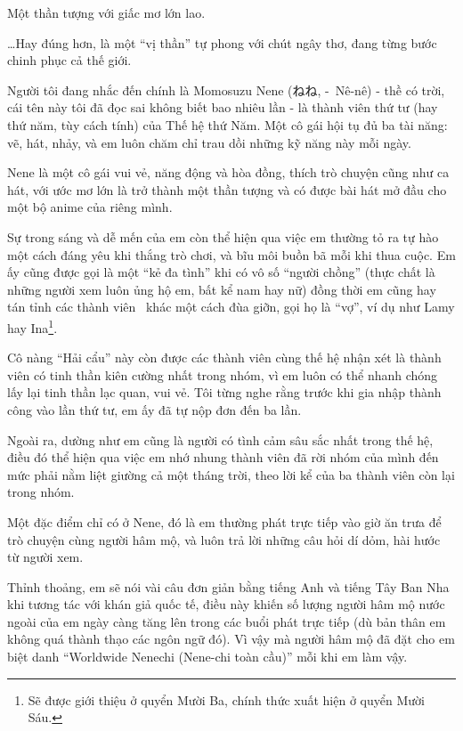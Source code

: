 \documentclass[../main.tex]{subfiles}
\begin{document}
Một thần tượng với giấc mơ lớn lao.

\dots Hay đúng hơn, là một ``vị thần'' tự phong với chút ngây thơ, đang từng bước chinh phục cả thế giới.

\chrint


Người tôi đang nhắc đến chính là Momosuzu Nene (ねね, -\ Nê-nê) - thề có trời, cái tên này tôi đã đọc sai không biết bao nhiêu lần - là thành viên thứ tư (hay thứ năm, tùy cách tính) của Thế hệ thứ Năm. Một cô gái hội tụ đủ ba tài năng: vẽ, hát, nhảy, và em luôn chăm chỉ trau dồi những kỹ năng này mỗi ngày.

Nene là một cô gái vui vẻ, năng động và hòa đồng, thích trò chuyện cũng như ca hát, với ước mơ lớn là trở thành một thần tượng và có được bài hát mở đầu cho một bộ anime của riêng mình.

Sự trong sáng và dễ mến của em còn thể hiện qua việc em thường tỏ ra tự hào một cách đáng yêu khi thắng trò chơi, và bĩu môi buồn bã mỗi khi thua cuộc. Em ấy cũng được gọi là một ``kẻ đa tình'' khi có vô số ``người chồng'' (thực chất là những người xem luôn ủng hộ em, bất kể nam hay nữ) đồng thời em cũng hay tán tỉnh các thành viên \hll\ khác một cách đùa giỡn, gọi họ là ``vợ'', ví dụ như Lamy hay Ina\footnote{Sẽ được giới thiệu ở quyển Mười Ba, chính thức xuất hiện ở quyển Mười Sáu.}.

Cô nàng ``Hải cẩu'' này còn được các thành viên cùng thế hệ nhận xét là thành viên có tinh thần kiên cường nhất trong nhóm, vì em luôn có thể nhanh chóng lấy lại tinh thần lạc quan, vui vẻ. Tôi từng nghe rằng trước khi gia nhập thành công vào lần thứ tư, em ấy đã tự nộp đơn đến ba lần.

Ngoài ra, dường như em cũng là người có tình cảm sâu sắc nhất trong thế hệ, điều đó thể hiện qua việc em nhớ nhung thành viên đã rời nhóm của mình đến mức phải nằm liệt giường cả một tháng trời, theo lời kể của ba thành viên còn lại trong nhóm.

Một đặc điểm chỉ có ở Nene, đó là em thường phát trực tiếp vào giờ ăn trưa để trò chuyện cùng người hâm mộ, và luôn trả lời những câu hỏi dí dỏm, hài hước từ người xem.

Thỉnh thoảng, em sẽ nói vài câu đơn giản bằng tiếng Anh và tiếng Tây Ban Nha khi tương tác với khán giả quốc tế, điều này khiến số lượng người hâm mộ nước ngoài của em ngày càng tăng lên trong các buổi phát trực tiếp (dù bản thân em không quá thành thạo các ngôn ngữ đó). Vì vậy mà người hâm mộ đã đặt cho em biệt danh ``Worldwide Nenechi (Nene-chi toàn cầu)'' mỗi khi em làm vậy.
\end{document}
